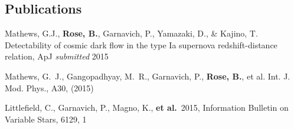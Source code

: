 \documentclass[margin]{res}
\begin{document}
\begin{resume}
\section{Publications}
Mathews, G.J., {\bf Rose, B.}, Garnavich, P., Yamazaki, D., \& Kajino, T. Detectability of cosmic dark flow in the type Ia supernova redshift-distance relation, ApJ {\it submitted} 2015

Mathews, G.~J., Gangopadhyay, M.~R., Garnavich, P., {\bf Rose, B.}, et al. Int. J. Mod. Phys., A30, (2015)

Littlefield, C., Garnavich, P., Magno, K., {\bf et al.}\ 2015, Information Bulletin on Variable Stars, 6129, 1








\end{resume}
\end{document}
